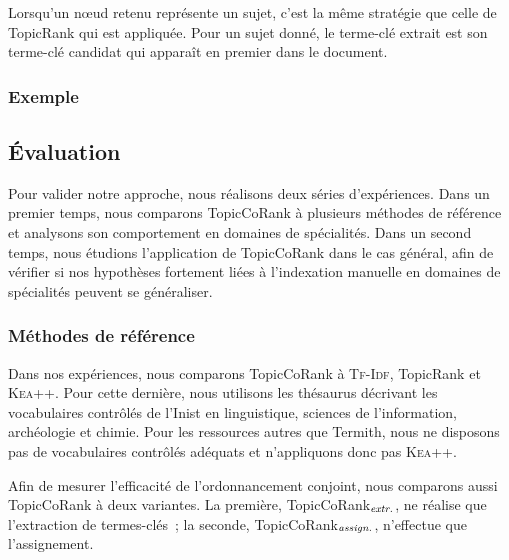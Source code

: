         Lorsqu'un n\oe{}ud retenu représente un sujet, c'est la même stratégie
        que celle de TopicRank qui est appliquée. Pour un sujet donné, le
        terme-clé extrait est son terme-clé candidat qui apparaît en premier
        dans le document.

      \subsubsection{Exemple}
      \label{subsubsec:main-domain_specific_keyphrase_annotation-supervised_automatic_keyphrase_extraction-topiccorank-exemple}
        \TODO{\dots}
        

    \subsection{Évaluation}
    \label{subsec:main-domain_specific_keyphrase_annotation-supervised_automatic_keyphrase_annotation-evaluation}
      Pour valider notre approche, nous réalisons deux séries d'expériences.
      Dans un premier temps, nous comparons TopicCoRank à plusieurs méthodes de
      référence et analysons son comportement en domaines de spécialités. Dans
      un second temps, nous étudions l'application de TopicCoRank dans le cas
      général, afin de vérifier si nos hypothèses fortement liées à l'indexation
      manuelle en domaines de spécialités peuvent se généraliser.

      \subsubsection{Méthodes de référence}
      \label{subsubsec:main-domain_specific_keyphrase_annotation-supervised_automatic_keyphrase_annotation-evaluation-baselines}
        Dans nos expériences, nous comparons TopicCoRank à \textsc{Tf-Idf},
        TopicRank et \textsc{Kea++}. Pour cette dernière, nous utilisons les
        thésaurus décrivant les vocabulaires contrôlés de l'Inist en
        linguistique, sciences de l'information, archéologie et chimie. Pour les
        ressources autres que Termith, nous ne disposons pas de vocabulaires
        contrôlés adéquats et n'appliquons donc pas \textsc{Kea++}.

        Afin de mesurer l'efficacité de l'ordonnancement conjoint, nous
        comparons aussi TopicCoRank à deux variantes. La première,
        TopicCoRank$_\textnormal{\textit{extr.}}$, ne réalise que l'extraction
        de termes-clés~; la seconde,
        TopicCoRank$_\textnormal{\textit{assign.}}$, n'effectue que
        l'assignement.

